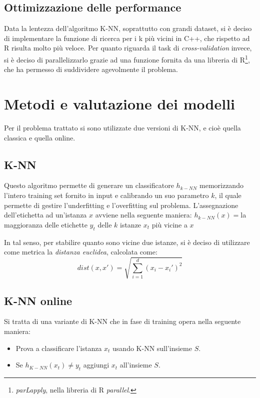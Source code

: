 \documentclass[fleqn,10pt]{SelfArx} %
\begin{document}
\subsection{Ottimizzazione delle performance}
Data la lentezza dell'algoritmo K-NN, soprattutto con grandi dataset, si è deciso di implementare la funzione di ricerca per i k più vicini in C++, che rispetto ad R risulta molto più veloce. Per quanto riguarda il task di \emph{cross-validation} invece, si è deciso di parallelizzarlo grazie ad una funzione fornita da una libreria di R\footnote{\emph{parLapply}, nella libreria di R \emph{parallel}.}, che ha permesso di suddividere agevolmente il problema.




\section{Metodi e valutazione dei modelli}

Per il problema trattato si sono utilizzate due versioni di K-NN, e cioè quella classica e quella online.

\subsection{K-NN}
Questo algoritmo permette di generare un classificatore $h_{k-NN}$ memorizzando l'intero training set fornito in input e calibrando un suo parametro $k$, il quale permette di gestire l'underfitting e l'overfitting sul problema.
\newline
\newline
L'assegnazione dell'etichetta ad un'istanza $x$ avviene nella seguente maniera:
\newline
\newline
\textbf{$h_{k-NN}(x)=$}la maggioranza delle etichette $y_t$ delle $k$ istanze $x_t$ più vicine a $x$
\newline

In tal senso, per stabilire quanto sono vicine due istanze, si è deciso di utilizzare come metrica la \emph{distanza euclidea}, calcolata come:
\[
dist(x, x') = \sqrt{\sum_{i=1}^{d}(x_i - x_{i}')^{2}}
\]

\subsection{K-NN online}
Si tratta di una variante di K-NN che in fase di training opera nella seguente maniera:
\begin{itemize}
\item Prova a classificare l'istanza $x_t$ usando K-NN sull'insieme $S$.
\item Se $h_{K-NN}(x_t)\neq y_t$ aggiungi $x_t$ all'insieme $S$.
\end{itemize}
\end{document}
